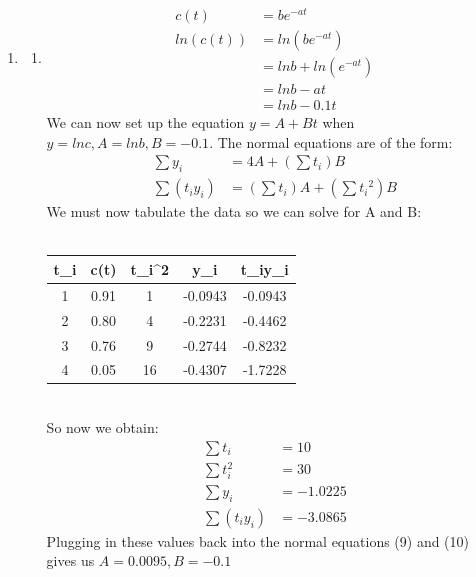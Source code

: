 \documentclass{article}
\begin{document}
\begin{enumerate}
        \item
        \begin{enumerate}
            \item 
            \begin{align*}
                c(t) &= be^{-at} \\
                ln(c(t)) &= ln(be^{-at}) \\
                &= lnb + ln(e^{-at}) \\
                &= lnb - at \\
                &= lnb - 0.1t
            \end{align*}
            We can now set up the equation $y = A + Bt$ when $y=lnc, A=lnb, B=-0.1$. The normal equations are of the form:
            \begin{align}
                \sum{y_i} &= 4A + (\sum{t_i})B \\
                \sum{(t_iy_i)} &= (\sum{t_i})A + (\sum{t_i}^2)B 
            \end{align}
            We must now tabulate the data so we can solve for A and B:\\ \\
            \begin{table}
            \centering
            \begin{tabular}{||c c c c c||} 
            \hline
            t_i & c(t) & t_i^2 & y_i & t_iy_i  \\ [0.5ex] 
            \hline \hline
            1 & 0.91 & 1 & -0.0943 & -0.0943 \\ 
            \hline
            2 & 0.80 & 4 & -0.2231 & -0.4462 \\
            \hline
            3 & 0.76 & 9 & -0.2744 & -0.8232 \\
            \hline
            4 & 0.05 & 16 & -0.4307 & -1.7228 \\
            \hline
            \end{tabular} 
            \end{table}
            \\
            So now we obtain:
            \begin{align*}
                \sum{t_i} &= 10 \\
                \sum{t_i^2} &= 30 \\
                \sum{y_i} &= -1.0225 \\
                \sum{(t_iy_i)} &= -3.0865
            \end{align*}
            Plugging in these values back into the normal equations (9) and (10) gives us $A = 0.0095, B=-0.1$

\end{enumerate}
\end{enumerate}
\end{document}
